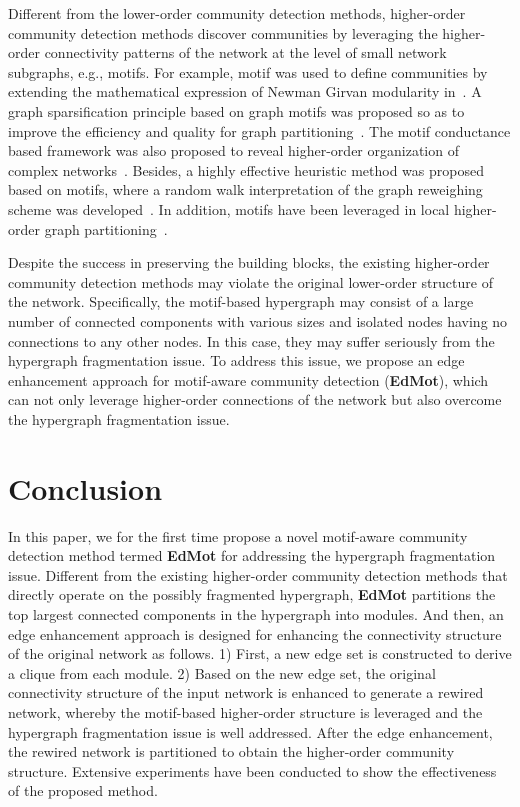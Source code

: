 \documentclass[sigconf]{acmart}
\begin{document}
Different from the lower-order community detection methods, higher-order community detection methods discover communities by leveraging the higher-order connectivity patterns of the network at the level of small network subgraphs, e.g., motifs.
For example, motif was used to define communities by extending the mathematical expression of Newman Girvan modularity in~\cite{arenas2008motif}. A graph sparsification principle based on graph motifs was proposed so as to improve the efficiency and quality for graph partitioning~\cite{zhao2015gsparsify}. The motif conductance based framework was also proposed to reveal higher-order organization of complex networks~\cite{benson2016higher}. Besides, a highly effective heuristic method was proposed based on motifs, where a random walk interpretation of the graph reweighing scheme was developed~\cite{tsourakakis2017scalable}. In addition, motifs have been leveraged in local higher-order graph partitioning~\cite{yin2017local}.

Despite the success in preserving the building blocks, the existing higher-order community detection methods may violate the original lower-order structure of the network. Specifically, the motif-based hypergraph may consist of a large number of connected components with various sizes and isolated nodes having no connections to any other nodes. In this case, they may suffer seriously from the hypergraph fragmentation issue. To address this issue, we propose an edge enhancement approach for motif-aware community detection (\textbf{EdMot}), which can not only leverage higher-order connections of the network but also overcome the hypergraph fragmentation issue.





\section{Conclusion}
\label{sec:conclusion}

In this paper, we for the first time propose a novel motif-aware community detection method termed \textbf{EdMot} for addressing the hypergraph fragmentation issue. Different from the existing higher-order community detection methods that directly operate on the possibly fragmented hypergraph, \textbf{EdMot} partitions the top  largest connected components in the hypergraph into modules. And then, an edge enhancement approach is designed for enhancing the connectivity structure of the original network as follows. 1) First, a new edge set is constructed to derive a clique from each module. 2) Based on the new edge set, the original connectivity structure of the input network is enhanced to generate a rewired network, whereby the motif-based higher-order structure is leveraged and the hypergraph fragmentation issue is well addressed. After the edge enhancement, the rewired network is partitioned to obtain the higher-order community structure. Extensive experiments have been conducted to show the effectiveness of the proposed method.
\end{document}
